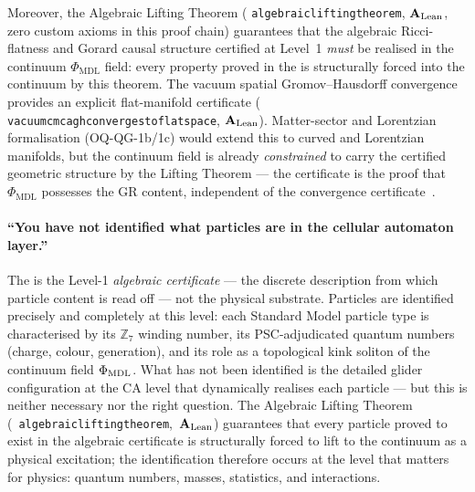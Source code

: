 \documentclass[11pt]{article}
\newcommand{\CMCA}{\text{CMCA}}
\newcommand{\PHIMDL}{\ensuremath{\Phi_{\mathrm{MDL}}}}
\newcommand{\lean}[1]{%
  \penalty-100
  \begingroup\def\_{\textunderscore\allowbreak}\texttt{#1}\endgroup}
\newcommand{\CatAL}{\ensuremath{\textbf{A}_{\rm Lean}}}
\begin{document}
Moreover, the Algebraic Lifting Theorem
(\lean{algebraic\_lifting\_theorem}, \CatAL, zero custom axioms in this proof chain) guarantees
that the algebraic Ricci-flatness and Gorard causal structure certified at Level~1
\emph{must} be realised in the continuum $\PHIMDL$ field: every property proved in
the \CMCA{} is structurally forced into the continuum by this theorem.  The
vacuum spatial Gromov--Hausdorff convergence provides an explicit flat-manifold
certificate (\lean{vacuum\_cmca\_gh\_converges\_to\_flat\_space}, \CatAL). Matter-sector
and Lorentzian formalisation (OQ-QG-1b/1c) would extend this to curved and Lorentzian
manifolds, but the continuum field is already \emph{constrained} to carry the certified
geometric structure by the Lifting Theorem --- the certificate is the proof that
$\PHIMDL$ possesses the GR content, independent of the convergence
certificate~\cite{SpivackGTECompleteFramework}.

\paragraph{``You have not identified what particles are in the cellular automaton layer.''}
The \CMCA{} is the Level-1 \emph{algebraic certificate} --- the discrete description
from which particle content is read off --- not the physical substrate.  Particles are
identified precisely and completely at this level: each Standard Model particle type is
characterised by its $\mathbb{Z}_7$ winding number, its PSC-adjudicated quantum numbers
(charge, colour, generation), and its role as a topological kink soliton of the
continuum field $\Phi_{\rm MDL}$.  What has not been identified is the detailed glider
configuration at the CA level that dynamically realises each particle --- but this is
neither necessary nor the right question.  The Algebraic Lifting Theorem
\mbox{(\lean{algebraic\_lifting\_theorem}, \CatAL)} guarantees that every particle proved
to exist in the algebraic certificate is structurally forced to lift to the continuum
as a physical excitation; the identification therefore occurs at the level that matters
for physics: quantum numbers, masses, statistics, and interactions.
\end{document}
